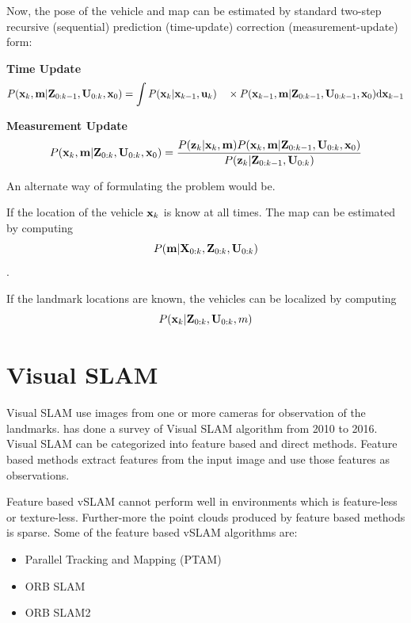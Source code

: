 Now, the pose of the vehicle and map can be estimated by standard two-step recursive (sequential) prediction (time-update) correction (measurement-update) form:

\textbf{Time Update}
\begin{equation}
P({\bf x}_{k},{\bf m}\vert {\bf Z}_{0:k-1},{\bf U}_{0:k},{\bf x}_{0})= \int P({\bf x}_{k}\vert {\bf x}_{k-1},{\bf u}_{k}) \quad\times P({\bf x}_{k-1},{\bf m}\vert {\bf Z}_{0:k-1}, {\bf U}_{0:k-1},{\bf x}_{0}){\rm d}{\bf x}_{k-1}
\end{equation}

\textbf{Measurement Update}
\begin{equation}
P({\bf x}_{k},{\bf m}\vert {\bf Z}_{0:k},{\bf U}_{0:k},{\bf x}_{0}) = {P({\bf z}_{k}\vert {\bf x}_{k},{\bf m})P({\bf x}_{k}, {\bf m}\vert {\bf Z}_{0:k-1},{\bf U}_{0:k},{\bf x}_{0})\over P({\bf z}_{k}\vert {\bf Z}_{0:k-1},{\bf U}_{0:k})}
\end{equation}

An alternate way of formulating the problem would be.

If the location of the vehicle ${\bf x}_k$ is know at all times. The map can be estimated by computing
\begin{equation}
P({\bf m}\vert {\bf X}_{0:k},{\bf Z}_{0:k}, {\bf U}_{0:k})
\end{equation}
. 

If the landmark locations are known, the vehicles can be localized by computing
\begin{equation}
P({\bf x}_k\vert {\bf Z}_{0:k},{\bf U}_{0:k}, m)
\end{equation}

\section{Visual SLAM}
Visual SLAM use images from one or more cameras for observation of the landmarks.  has done a survey of Visual SLAM algorithm from 2010 to 2016. Visual SLAM can be categorized into feature based and direct methods. Feature based methods extract features from the input image and use those features as observations.

Feature based vSLAM cannot perform well in environments which is feature-less or texture-less. Further-more the point clouds produced by feature based methods is sparse. Some of the feature based vSLAM algorithms are:

\begin{itemize}
	\item Parallel Tracking and Mapping (PTAM) \cite{4538852}
	\item ORB SLAM \cite{7219438}
	\item ORB SLAM2 \cite{7946260}
	
\end{itemize}


